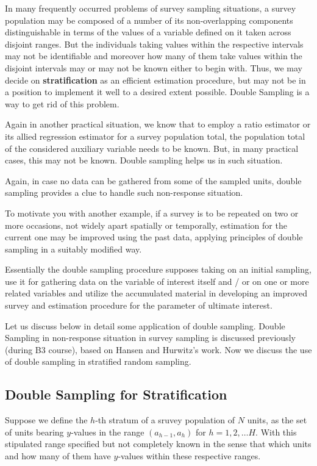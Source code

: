 \documentclass[12pt]{article}
\theoremstyle{definition}
\begin{document}
In many frequently occurred problems of survey sampling situations, a survey population may be composed of a number of its non-overlapping components distinguishable in terms of the values of a variable defined on it taken across disjoint ranges. But the individuals taking values within the respective intervals may not be identifiable and moreover how many of them take values within the disjoint intervals may or may not be known either to begin with. Thus, we may decide on \textbf{stratification} as an efficient estimation procedure, but may not be in a position to implement it well to a desired extent possible. Double Sampling is a way to get rid of this problem.

Again in another practical situation, we know that to employ a ratio estimator or its allied regression estimator for a survey population total, the population total of the considered auxiliary variable needs to be known. But, in many practical cases, this may not be known. Double sampling helps us in such situation.

Again, in case no data can be gathered from some of the sampled units, double sampling provides a clue to handle such non-response situation.

To motivate you with another example, if a survey is to be repeated on two or more occasions, not widely apart spatially or temporally, estimation for the current one may be improved using the past data, applying principles of double sampling in a suitably modified way.

Essentially the double sampling procedure supposes taking on an initial sampling, use it for gathering data on the variable of interest itself and / or on one or more related variables and utilize the accumulated material in developing an improved survey and estimation procedure for the parameter of ultimate interest.

Let us discuss below in detail some application of double sampling. Double Sampling in non-response situation in survey sampling is discussed previously (during B3 course), based on Hansen and Hurwitz's work. Now we discuss the use of double sampling in stratified random sampling.


\subsection{Double Sampling for Stratification}

Suppose we define the $h$-th stratum of a sruvey population of $N$ units, as the set of units bearing $y$-values in the range $(a_{h-1}, a_h)$ for $h = 1, 2, \dots H$. With this stipulated range specified but not completely known in the sense that which units and how many of them have $y$-values within these respective ranges.
\end{document}
